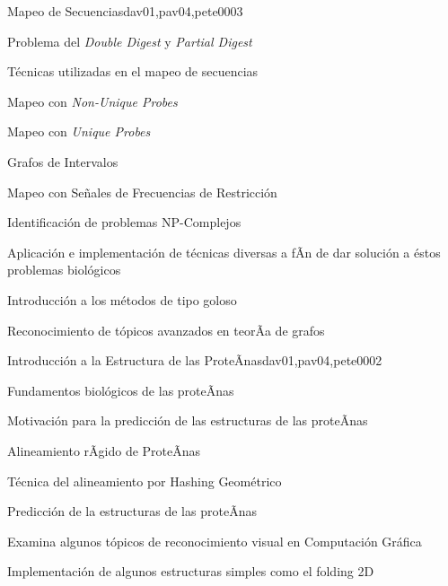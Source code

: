 \begin{syllabus}
\begin{unit}{Mapeo de Secuencias}{dav01,pav04,pete00}{0}{3}
\begin{topics}
        \item Problema del \textit{Double Digest} y \textit{Partial Digest}
        \item Técnicas utilizadas en el mapeo de secuencias
        \item Mapeo con \textit{Non-Unique Probes}
        \item Mapeo con \textit{Unique Probes}
        \item Grafos de Intervalos
        \item Mapeo con Señales de Frecuencias de Restricción
    \end{topics}
    \begin{unitgoals}
        \item Identificación de problemas NP-Complejos
        \item Aplicación e implementación de técnicas diversas a fÃ­n de dar solución a éstos problemas biológicos
        \item Introducción a los métodos de tipo goloso
        \item Reconocimiento de tópicos avanzados en teorÃ­a de grafos
    \end{unitgoals}
\end{unit}

\begin{unit}{Introducción a la Estructura de las ProteÃ­nas}{dav01,pav04,pete00}{0}{2}
\begin{topics}
        \item Fundamentos biológicos de las proteÃ­nas
        \item Motivación para la predicción de las estructuras de las proteÃ­nas
        \item Alineamiento rÃ­gido de ProteÃ­nas
        \item Técnica del alineamiento por Hashing Geométrico
        \item Predicción de la estructuras de las proteÃ­nas
    \end{topics}

    \begin{unitgoals}
        \item Examina algunos tópicos de reconocimiento visual en Computación Gráfica
        \item Implementación de algunos estructuras simples como el folding 2D
    \end{unitgoals}
\end{unit}



\begin{coursebibliography}
\end{coursebibliography}

\end{syllabus}
